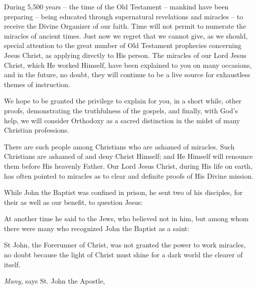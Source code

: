 During 5,500 years -- the time of the Old Testament -- mankind have been preparing -- being educated through supernatural revelations and miracles -- to receive the Divine Organizer of our faith. Time will not permit to numerate the miracles of ancient times. Just now we regret that we cannot give, as we should, special attention to the great number of Old Testament prophecies concerning Jesus Christ, as applying directly to His person. The miracles of our Lord Jesus Christ, which He worked Himself, have been explained to you on many occasions, and in the future, no doubt, they will continue to be a live source for exhaustless themes of instruction.

We hope to be granted the privilege to explain for you, in a short while, other proofs, demonstrating the truthfulness of the gospels, and finally, with God's help, we will consider Orthodoxy as a sacred distinction in the midst of many Christian professions.

There are such people among Christians who are ashamed of miracles. Such Christians are ashamed of and deny Christ Himself; and He Himself will renounce them before His heavenly Father. Our Lord Jesus Christ, during His life on earth, has often pointed to miracles as to clear and definite proofs of His Divine mission.

While John the Baptist was confined in prison, he sent two of his disciples, for their as well as our benefit, to question Jesus: 

At another time he said to the Jews, who believed not in him, but among whom there were many who recognized John the Baptist as a saint: 

St John, the Forerunner of Christ, was not granted the power to work miracles, no doubt because the light of Christ must shine for a dark world the clearer of itself.

\textit{Many,} says St. John the Apostle, 

